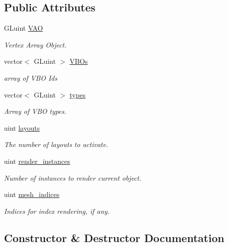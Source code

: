 \subsection*{Public Attributes}
\begin{DoxyCompactItemize}
\item 
G\+Luint \mbox{\hyperlink{classObject__3D_a88a13ab6c05c3d5b9368ca03cb03c021}{V\+AO}}
\begin{DoxyCompactList}\small\item\em Vertex Array Object. \end{DoxyCompactList}\item 
vector$<$ G\+Luint $>$ \mbox{\hyperlink{classObject__3D_acfd04c0df55218879d7d66ee91a22ea5}{V\+B\+Os}}
\begin{DoxyCompactList}\small\item\em array of V\+BO Ids \end{DoxyCompactList}\item 
vector$<$ G\+Luint $>$ \mbox{\hyperlink{classObject__3D_a8615002b3e455ab32f57e91651c30c6a}{types}}
\begin{DoxyCompactList}\small\item\em Array of V\+BO types. \end{DoxyCompactList}\item 
uint \mbox{\hyperlink{classObject__3D_a8d3d45ffb70d9725a4907d23d0f73d62}{layouts}}
\begin{DoxyCompactList}\small\item\em The number of layouts to activate. \end{DoxyCompactList}\item 
uint \mbox{\hyperlink{classObject__3D_a60fe95e517a5446abd13634a005f08bb}{render\+\_\+instances}}
\begin{DoxyCompactList}\small\item\em Number of instances to render current object. \end{DoxyCompactList}\item 
uint \mbox{\hyperlink{classObject__3D_a2240360a2257365eb86666b4a25bb307}{mesh\+\_\+indices}}
\begin{DoxyCompactList}\small\item\em Indices for index rendering, if any. \end{DoxyCompactList}\end{DoxyCompactItemize}


\subsection{Constructor \& Destructor Documentation}
\mbox{\label{classObject__3D_a818bdde880dd695da08c3e23691caa59}} 
